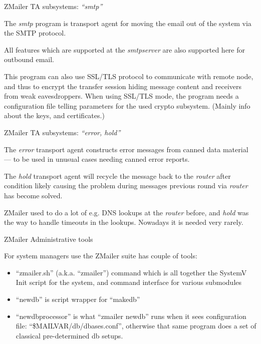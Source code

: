 \documentclass[a4paper,landscape]{slides}
\newcommand{\ZM}{ZMailer}
\begin{document}
\begin{slide}

\centerline{\large \ZM{} TA subsystems: {\em ``smtp''}}

The {\em smtp} program is transport agent for moving the email
out of the system via the SMTP protocol.

All features which are supported at the {\em smtpserver} are
also supported here for outbound email.

This program can also use SSL/TLS protocol to communicate with
remote node, and thus to encrypt the transfer session hiding
message content and receivers from weak eavesdroppers.
When using SSL/TLS mode, the program needs a configuration file
telling parameters for the used crypto subsystem.
(Mainly info about the keys, and certificates.)

\vfill
\end{slide}



\begin{slide}

\centerline{\large \ZM{} TA subsystems: {\em ``error, hold''}}

The {\em error} transport agent constructs error messages from
canned data material --- to be used in unusual cases needing
canned error reports.

The {\em hold} transport agent will recycle the message back to
the {\em router} after condition likely causing the problem
during messages previous round via {\em router} has become solved.

\ZM{} used to do a lot of e.g. DNS lookups at the {\em router} before,
and {\em hold} was the way to handle timeouts in the lookups.
Nowadays it is needed very rarely.

\vfill
\end{slide}



\begin{slide}
\centerline{\large \ZM{} Administrative tools}

For system managers use the \ZM{} suite has couple of tools:

\begin{itemize}
\item
``zmailer.sh'' (a.k.a. ``zmailer'') command which is all together
the SystemV Init script for the system, and command interface for
various submodules

\item
``newdb'' is script wrapper for ``makedb''

\item
``newdbprocessor'' is what ``zmailer newdb'' runs when it sees configuration
file: ``\$MAILVAR/db/dbases.conf'', otherwise that
same program does a set of classical pre-determined db setups.

\end{itemize}
\vfill
\end{slide}
\end{document}
